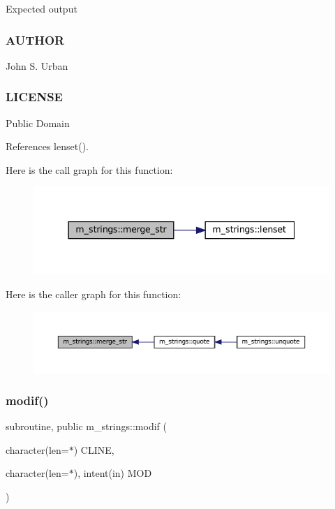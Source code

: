 Expected output \begin{DoxyVerb}
\end{DoxyVerb}
 \subsubsection*{A\+U\+T\+H\+OR}

John S. Urban \subsubsection*{L\+I\+C\+E\+N\+SE}

Public Domain 

References lenset().

Here is the call graph for this function\+:\nopagebreak
\begin{figure}[H]
\begin{center}
\leavevmode
\includegraphics[width=337pt]{namespacem__strings_aba5a8d7fc092b38d1939f37a13247c1e_cgraph}
\end{center}
\end{figure}
Here is the caller graph for this function\+:\nopagebreak
\begin{figure}[H]
\begin{center}
\leavevmode
\includegraphics[width=350pt]{namespacem__strings_aba5a8d7fc092b38d1939f37a13247c1e_icgraph}
\end{center}
\end{figure}
\mbox{\label{namespacem__strings_aec887410b018916a683fbb2ae529f8c5}} 
\subsubsection{\texorpdfstring{modif()}{modif()}}
{\footnotesize\ttfamily subroutine, public m\+\_\+strings\+::modif (\begin{DoxyParamCaption}\item[{character(len=$\ast$)}]{C\+L\+I\+NE,  }\item[{character(len=$\ast$), intent(in)}]{M\+OD }\end{DoxyParamCaption})}



